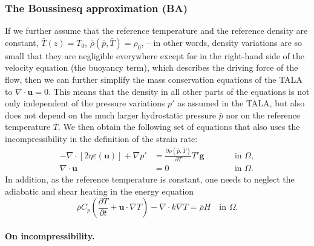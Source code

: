 \documentclass{article}
\begin{document}
\subsubsection{The Boussinesq approximation (BA)}
\label{sec:Boussinesq}

If we further assume that the reference temperature and the reference density are constant, 
$\bar T(z)=T_0$, $\bar\rho(\bar p,\bar T)=\rho_0$, 
-- in other words, density variations are so small that 
they are negligible everywhere except for in the right-hand side of the velocity 
equation (the buoyancy term), which describes the driving force of the flow, 
then we can further simplify the mass conservation equations of the
TALA to $\nabla \cdot \mathbf u=0$. 
This means that the density in all other parts of the equations is not only independent of
the pressure variations $p'$ as assumed in the TALA, but also does not depend on
the much larger hydrostatic pressure $\bar p$ nor on the reference temperature
$\bar T$. We then obtain the following set of
equations that also uses the incompressibility in the definition of the strain rate:
\begin{align}
  \label{eq:stokes-BA-1}
  -\nabla \cdot \left[2\eta \varepsilon(\mathbf u)
                \right] + \nabla p' &=
  \frac{\partial \rho(\bar p,\bar T)}{\partial T} T' \mathbf g
  & \qquad
  & \textrm{in $\Omega$},
  \\
  \label{eq:stokes-BA-2}
  \nabla \cdot \mathbf u &= 0
  & \qquad
  & \textrm{in $\Omega$}.
\end{align}
In addition, as the reference temperature is constant, one needs to neglect the
adiabatic and shear heating in the energy equation
\begin{equation}
  \label{eq:temperature-BA}
  \bar\rho C_p \left(\frac{\partial T}{\partial t} + \mathbf u\cdot\nabla
  T\right) - \nabla\cdot k\nabla T
  =
  \bar\rho H
  \quad
  \textrm{in $\Omega$}.
\end{equation}

\paragraph*{On incompressibility.}
\end{document}
